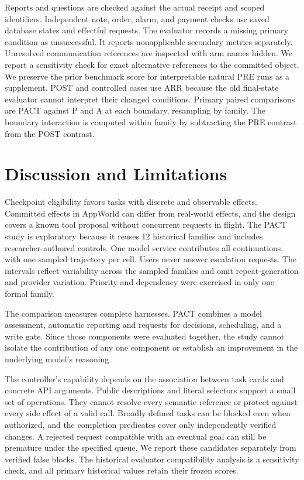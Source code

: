 \documentclass[conference]{IEEEtran}
\begin{document}
Reports and questions are checked against the actual receipt and scoped identifiers. Independent note, order, alarm, and payment checks use saved database states and effectful requests. The evaluator records a missing primary condition as unsuccessful. It reports nonapplicable secondary metrics separately. Unresolved communication references are inspected with arm names hidden. We report a sensitivity check for exact alternative references to the committed object. We preserve the prior benchmark score for interpretable natural PRE runs as a supplement. POST and controlled cases use ARR because the old final-state evaluator cannot interpret their changed conditions. Primary paired comparisons are PACT against P and A at each boundary, resampling by family. The boundary interaction is computed within family by subtracting the PRE contrast from the POST contrast.



\section{Discussion and Limitations}
Checkpoint eligibility favors tasks with discrete and observable effects. Committed effects in AppWorld can differ from real-world effects, and the design covers a known tool proposal without concurrent requests in flight. The PACT study is exploratory because it reuses 12 historical families and includes researcher-authored controls. One model service contributes all continuations, with one sampled trajectory per cell. Users never answer escalation requests. The intervals reflect variability across the sampled families and omit repeat-generation and provider variation. Priority and dependency were exercised in only one formal family.

The comparison measures complete harnesses. PACT combines a model assessment, automatic reporting and requests for decisions, scheduling, and a write gate. Since those components were evaluated together, the study cannot isolate the contribution of any one component or establish an improvement in the underlying model's reasoning.

The controller's capability depends on the association between task cards and concrete API arguments. Public descriptions and literal selectors support a small set of operations. They cannot resolve every semantic reference or protect against every side effect of a valid call. Broadly defined tasks can be blocked even when authorized, and the completion predicates cover only independently verified changes. A rejected request compatible with an eventual goal can still be premature under the specified queue. We report these candidates separately from verified false blocks. The historical evaluator compatibility analysis is a sensitivity check, and all primary historical values retain their frozen scores.
\end{document}
